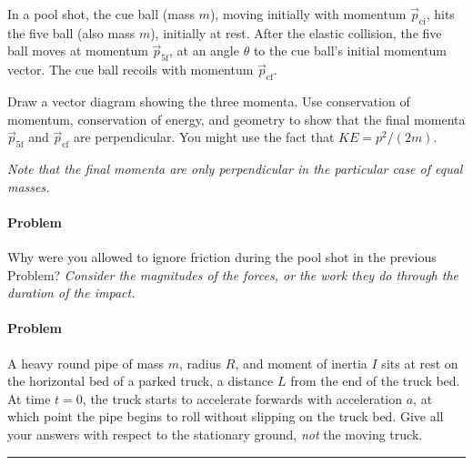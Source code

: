 \documentclass[12pt]{article}
\newcounter{problem}
\begin{document}
In a pool shot, the cue ball (mass $m$), moving initially with
momentum $\vec{p}_\mathrm{ci}$, hits the five ball (also mass $m$),
initially at rest.  After the elastic collision, the five ball moves
at momentum $\vec{p}_\mathrm{5f}$, at an angle $\theta$ to the cue
ball's initial momentum vector.  The cue ball recoils with momentum
$\vec{p}_\mathrm{cf}$.

Draw a vector diagram showing the three momenta.  Use conservation of
momentum, conservation of energy, and geometry to show that the final
momenta $\vec{p}_\mathrm{5f}$ and $\vec{p}_\mathrm{cf}$ are
perpendicular.  You might use the fact that $KE= p^2/(2m)$.

\emph{Note that the final momenta are only perpendicular in the
particular case of equal masses.}

\paragraph{Problem~\theproblem}

Why were you allowed to ignore friction during the pool shot in the
previous Problem?  \emph{Consider the magnitudes of the forces, or the
work they do through the duration of the impact.}

\paragraph{Problem~\theproblem}

A heavy round pipe of mass $m$, radius $R$, and moment of inertia $I$
sits at rest on the horizontal bed of a parked truck, a distance $L$
from the end of the truck bed.  At time $t=0$, the truck starts to
accelerate forwards with acceleration $a$, at which point the pipe
begins to roll without slipping on the truck bed.  Give all your
answers with respect to the stationary ground, {\em not} the moving
truck.
\\ \rule{0.3\textwidth}{0pt}
\end{document}

